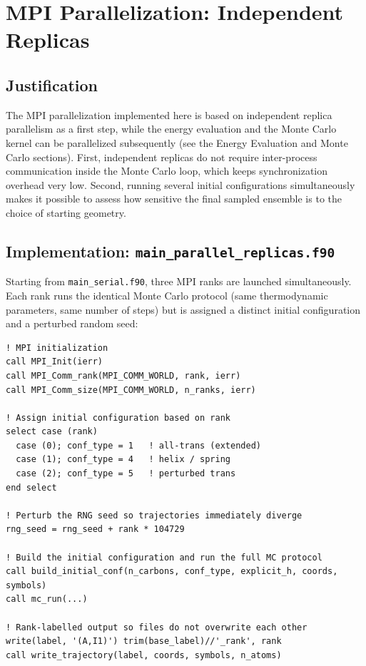 
\section{MPI Parallelization: Independent Replicas}
\label{sec:parallel_replicas}

\subsection{Justification}

The MPI parallelization implemented here is based on independent replica parallelism as a first step, while the energy evaluation and the Monte Carlo kernel can be parallelized subsequently (see the Energy Evaluation and Monte Carlo sections). First, independent replicas do not require inter-process communication inside the Monte Carlo loop, which keeps synchronization overhead very low. Second, running several initial configurations simultaneously makes it possible to assess how sensitive the final sampled ensemble is to the choice of starting geometry.

\subsection{Implementation: \texttt{main\_parallel\_replicas.f90}}

Starting from \texttt{main\_serial.f90}, three MPI ranks are launched
simultaneously. Each rank runs the identical Monte Carlo protocol (same
thermodynamic parameters, same number of steps) but is assigned a distinct
initial configuration and a perturbed random seed:

\begin{lstlisting}[caption={Rank-dependent configuration and seed assignment.}]
! MPI initialization
call MPI_Init(ierr)
call MPI_Comm_rank(MPI_COMM_WORLD, rank, ierr)
call MPI_Comm_size(MPI_COMM_WORLD, n_ranks, ierr)

! Assign initial configuration based on rank
select case (rank)
  case (0); conf_type = 1   ! all-trans (extended)
  case (1); conf_type = 4   ! helix / spring
  case (2); conf_type = 5   ! perturbed trans
end select

! Perturb the RNG seed so trajectories immediately diverge
rng_seed = rng_seed + rank * 104729

! Build the initial configuration and run the full MC protocol
call build_initial_conf(n_carbons, conf_type, explicit_h, coords, symbols)
call mc_run(...)

! Rank-labelled output so files do not overwrite each other
write(label, '(A,I1)') trim(base_label)//'_rank', rank
call write_trajectory(label, coords, symbols, n_atoms)
\end{lstlisting}


